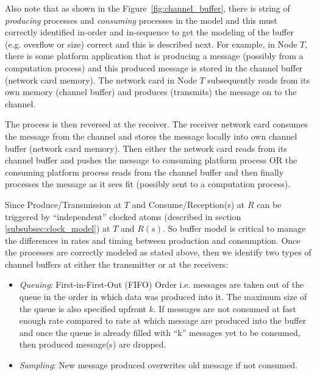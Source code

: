 Also note that as shown in the Figure~\ref{fig:channel_buffer}, there is string of \emph{producing} processes and \emph{consuming} processes in the model and this must correctly identified in-order and in-sequence to get the modeling of the buffer (e.g. overflow or size) correct and this is described next. For example, in Node $T$, there is some platform application that is producing a message (possibly from a computation process) and this produced message is stored in the channel buffer (network card memory). The network card in Node $T$ subsequently reads from its own memory (channel buffer) and produces (transmits) the message on to the channel. 

The process is then reversed at the receiver. The receiver network card consumes the message from the channel and stores the message locally into own channel buffer (network card memory). Then either the network card reads from its channel buffer and pushes the message to consuming platform process OR the consuming platform process reads from the channel buffer and then finally processes the message as it sees fit (possibly sent to a computation process).

Since Produce/Transmission at $T$ and Consume/Reception(s) at $R$ can be triggered by “independent” clocked atoms (described in section \ref{subsubsec:clock_model}) at $T$ and $R(s)$. So buffer model is critical to manage the differences in rates and timing between production and consumption. Once the processes are correctly modeled as stated above, then we identify two types of channel buffers at either the transmitter or at the receivers:
\begin{itemize}
\item \emph{Queuing}: First-in-First-Out (FIFO) Order i.e. messages are taken out of the queue in the order in which data was produced into it.  The maximum size of the queue is also specified upfront $k$. If messages are not consumed at fast enough rate compared to rate at which message are produced into the buffer and once the queue is already filled with   “k” messages yet to be consumed, then produced message(s) are dropped. 

\item \emph{Sampling}: New message produced overwrites old message if not consumed.

\end{itemize}


